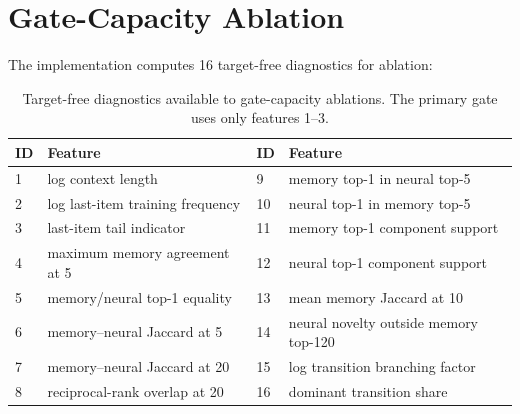 \documentclass[runningheads]{llncs}
\begin{document}
\section{Gate-Capacity Ablation}
The implementation computes 16 target-free diagnostics for ablation:
\begin{table}[H]
\caption{Target-free diagnostics available to gate-capacity ablations. The
primary gate uses only features 1--3.}
\label{tab:gate-diagnostics}
\centering\small
\begin{tabular}{p{}p{}p{}p{}}
\toprule
ID & Feature & ID & Feature\\
\midrule
1 & log context length & 9 & memory top-1 in neural top-5\\
2 & log last-item training frequency & 10 & neural top-1 in memory top-5\\
3 & last-item tail indicator & 11 & memory top-1 component support\\
4 & maximum memory agreement at 5 & 12 & neural top-1 component support\\
5 & memory/neural top-1 equality & 13 & mean memory Jaccard at 10\\
6 & memory--neural Jaccard at 5 & 14 & neural novelty outside memory top-120\\
7 & memory--neural Jaccard at 20 & 15 & log transition branching factor\\
8 & reciprocal-rank overlap at 20 & 16 & dominant transition share\\
\bottomrule
\end{tabular}
\end{table}
\end{document}
